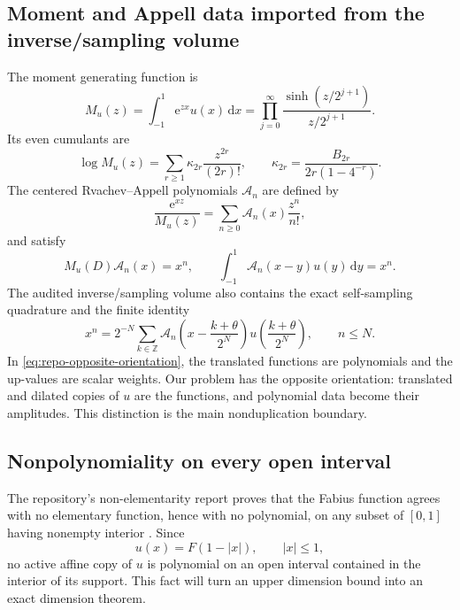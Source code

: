 \documentclass[11pt,oneside]{article}
\theoremstyle{definition}
\theoremstyle{remark}
\newcommand{\Z}{\mathbb Z}
\newcommand{\e}{\mathrm e}
\newcommand{\dd}{\,\mathrm d}
\begin{document}
\subsection{Moment and Appell data imported from the inverse/sampling volume}
The moment generating function is
\begin{equation}
 M_u(z)=\int_{-1}^{1}\e^{zx}u(x)\dd x
 =\prod_{j=0}^{\infty}
 \frac{\sinh(z/2^{j+1})}{z/2^{j+1}}.                      \label{eq:mgf}
\end{equation}
Its even cumulants are
\begin{equation}
 \log M_u(z)=\sum_{r\ge1}\kappa_{2r}\frac{z^{2r}}{(2r)!},
 \qquad
 \kappa_{2r}=\frac{B_{2r}}{2r(1-4^{-r})}.                 \label{eq:cumulants}
\end{equation}
The centered Rvachev--Appell polynomials $\mathcal A_n$ are defined by
\begin{equation}
 \frac{\e^{xz}}{M_u(z)}
 =\sum_{n\ge0}\mathcal A_n(x)\frac{z^n}{n!},             \label{eq:appell-egf}
\end{equation}
and satisfy
\begin{equation}
 M_u(D)\mathcal A_n(x)=x^n,
 \qquad
 \int_{-1}^{1}\mathcal A_n(x-y)u(y)\dd y=x^n.            \label{eq:appell-deconv}
\end{equation}
The audited inverse/sampling volume also contains the exact self-sampling quadrature and the finite identity
\begin{equation}
 x^n=2^{-N}\sum_{k\in\Z}
 \mathcal A_n\!\left(x-\frac{k+\theta}{2^N}\right)
 u\!\left(\frac{k+\theta}{2^N}\right),
 \qquad n\le N.                                           \label{eq:repo-opposite-orientation}
\end{equation}
In \eqref{eq:repo-opposite-orientation}, the translated functions are polynomials and the up-values are scalar weights.  Our problem has the opposite orientation: translated and dilated copies of $u$ are the functions, and polynomial data become their amplitudes.  This distinction is the main nonduplication boundary.

\subsection{Nonpolynomiality on every open interval}
The repository's non-elementarity report proves that the Fabius function agrees with no elementary function, hence with no polynomial, on any subset of $[0,1]$ having nonempty interior \cite{repoNonElementary}.  Since
\begin{equation}
 u(x)=F(1-|x|),\qquad |x|\le1,                              \label{eq:F-up}
\end{equation}
no active affine copy of $u$ is polynomial on an open interval contained in the interior of its support.  This fact will turn an upper dimension bound into an exact dimension theorem.
\end{document}
